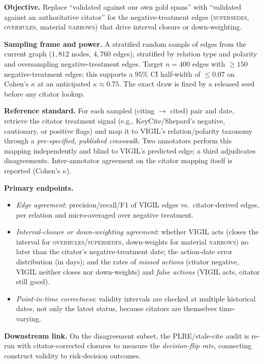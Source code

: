 \textbf{Objective.} Replace ``validated against our own gold spans'' with ``validated against an authoritative citator'' for the negative-treatment edges (\textsc{supersedes}, \textsc{overrules}, material \textsc{narrows}) that drive interval closure or down-weighting.

\textbf{Sampling frame and power.} A stratified random sample of edges from the current graph ($1{,}812$ nodes, $4{,}760$ edges), stratified by relation type and polarity and oversampling negative-treatment edges. Target $n\!=\!400$ edges with $\ge\!150$ negative-treatment edges; this supports a $95\%$ CI half-width of $\le\!0.07$ on Cohen's $\kappa$ at an anticipated $\kappa\!\approx\!0.75$. The exact draw is fixed by a released seed before any citator lookup.

\textbf{Reference standard.} For each sampled (citing $\rightarrow$ cited) pair and date, retrieve the citator treatment signal (e.g., KeyCite/Shepard's negative, cautionary, or positive flags) and map it to VIGIL's relation/polarity taxonomy through a \emph{pre-specified, published crosswalk}. Two annotators perform this mapping independently and blind to VIGIL's predicted edge; a third adjudicates disagreements. Inter-annotator agreement on the citator mapping itself is reported (Cohen's $\kappa$).

\textbf{Primary endpoints.}
\begin{itemize}[leftmargin=1.2em,itemsep=1pt,topsep=2pt]
  \item \emph{Edge agreement}: precision/recall/F1 of VIGIL edges vs.\ citator-derived edges, per relation and micro-averaged over negative treatment.
  \item \emph{Interval-closure or down-weighting agreement}: whether VIGIL acts (closes the interval for \textsc{overrules}/\textsc{supersedes}, down-weights for material \textsc{narrows}) no later than the citator's negative-treatment date; the action-date error distribution (in days); and the rates of \emph{missed actions} (citator negative, VIGIL neither closes nor down-weights) and \emph{false actions} (VIGIL acts, citator still good).
  \item \emph{Point-in-time correctness}: validity intervals are checked at multiple historical dates, not only the latest status, because citators are themselves time-varying.
\end{itemize}

\textbf{Downstream link.} On the disagreement subset, the PLRE/stale-cite audit is re-run with citator-corrected closures to measure the \emph{decision-flip rate}, connecting construct validity to risk-decision outcomes.

